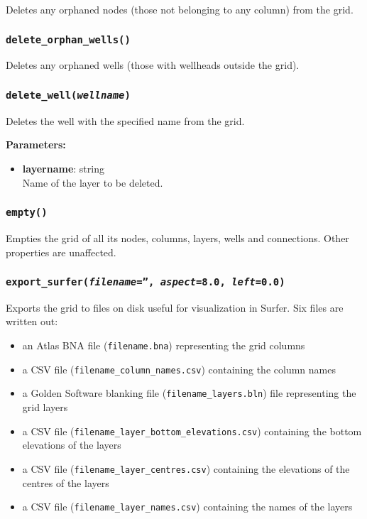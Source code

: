 Deletes any orphaned nodes (those not belonging to any column) from the grid.

\subsubsection{\texttt{delete\_orphan\_wells()}}

Deletes any orphaned wells (those with wellheads outside the grid).

\subsubsection{\texttt{delete\_well(\emph{wellname})}}

Deletes the well with the specified name from the grid.

\textbf{Parameters:}
\begin{itemize}
\item \textbf{layername}: string\\
  Name of the layer to be deleted.
\end{itemize}

\subsubsection{\texttt{empty()}}

Empties the grid of all its nodes, columns, layers, wells and connections.  Other properties are unaffected.

\subsubsection{\texttt{export\_surfer(\emph{filename}='', \emph{aspect}=8.0, \emph{left}=0.0)}}

Exports the grid to files on disk useful for visualization in Surfer.  Six files are written out:

\begin{itemize}
\item an Atlas BNA file (\texttt{filename.bna}) representing the grid columns
\item a CSV file (\texttt{filename\_column\_names.csv}) containing the column names
\item a Golden Software blanking file (\texttt{filename\_layers.bln}) file representing the grid layers
\item a CSV file (\texttt{filename\_layer\_bottom\_elevations.csv}) containing the bottom elevations of the layers
\item a CSV file (\texttt{filename\_layer\_centres.csv}) containing the elevations of the centres of the layers
\item a CSV file (\texttt{filename\_layer\_names.csv}) containing the names of the layers
\end{itemize}

